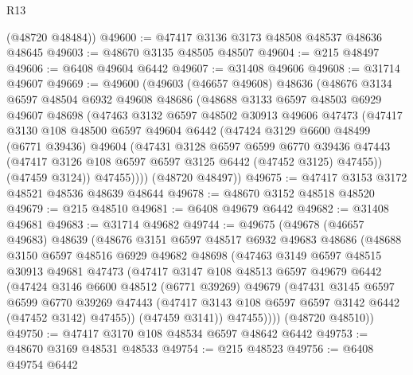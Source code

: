 \begin{lexlean}{R13}
\begin{coremodule}
      (@48720 @48484))
@49600 := @47417 @3136 @3173 @48508 @48537 @48636 @48645
@49603 := @48670 @3135 @48505 @48507
@49604 := @215 @48497
@49606 := @6408 @49604 @6442
@49607 := @31408 @49606
@49608 := @31714 @49607
@49669 := @49600
    (@49603
      (@46657 @49608)
      @48636
      (@48676
        @3134
        @6597
        @48504
        @6932
        @49608
        @48686
        (@48688
          @3133
          @6597
          @48503
          @6929
          @49607
          @48698
          (@47463
            @3132
            @6597
            @48502
            @30913
            @49606
            @47473
            (@47417
              @3130
              @108
              @48500
              @6597
              @49604
              @6442
              (@47424
                @3129
                @6600
                @48499
                (@6771 @39436)
                @49604
                (@47431
                  @3128
                  @6597
                  @6599
                  @6770
                  @39436
                  @47443
                  (@47417 @3126 @108 @6597 @6597 @3125 @6442 (@47452 @3125) @47455))
                (@47459 @3124))
              @47455))))
      (@48720 @48497))
@49675 := @47417 @3153 @3172 @48521 @48536 @48639 @48644
@49678 := @48670 @3152 @48518 @48520
@49679 := @215 @48510
@49681 := @6408 @49679 @6442
@49682 := @31408 @49681
@49683 := @31714 @49682
@49744 := @49675
    (@49678
      (@46657 @49683)
      @48639
      (@48676
        @3151
        @6597
        @48517
        @6932
        @49683
        @48686
        (@48688
          @3150
          @6597
          @48516
          @6929
          @49682
          @48698
          (@47463
            @3149
            @6597
            @48515
            @30913
            @49681
            @47473
            (@47417
              @3147
              @108
              @48513
              @6597
              @49679
              @6442
              (@47424
                @3146
                @6600
                @48512
                (@6771 @39269)
                @49679
                (@47431
                  @3145
                  @6597
                  @6599
                  @6770
                  @39269
                  @47443
                  (@47417 @3143 @108 @6597 @6597 @3142 @6442 (@47452 @3142) @47455))
                (@47459 @3141))
              @47455))))
      (@48720 @48510))
@49750 := @47417 @3170 @108 @48534 @6597 @48642 @6442
@49753 := @48670 @3169 @48531 @48533
@49754 := @215 @48523
@49756 := @6408 @49754 @6442

\end{coremodule}
\end{lexlean}
